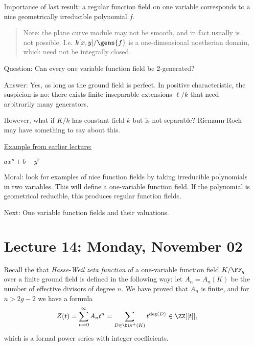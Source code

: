 Importance of last result: a regular function field on one variable
corresponds to a nice geometrically irreducible polynomial \(f\).

\begin{quote}
Note: the plane curve module may not be smooth, and in fact usually is
not possible. I.e. \(k[x ,y]/\gens{f}\) is a one-dimensional noetherian
domain, which need not be integrally closed.
\end{quote}

Question: Can every one variable function field be 2-generated?

Answer: Yes, as long as the ground field is perfect. In positive
characteristic, the suspicion is no: there exists finite inseparable
extensions \(\ell/k\) that need arbitrarily many generators.

However, what if \(K/k\) has constant field \(k\) but is not separable?
Riemann-Roch may have something to say about this.

\begin{example}

\hyperref[technical_example]{Example from earlier lecture:}

\(ax^p + b - y^b\)

\end{example}

Moral: look for examples of nice function fields by taking irreducible
polynomials in two variables. This will define a one-variable function
field. If the polynomial is geometrical reducible, this produces regular
function fields.

Next: One variable function fields and their valuations.

\hypertarget{lecture-14-monday-november-02}{%
\section{Lecture 14: Monday, November
02}\label{lecture-14-monday-november-02}}

Recall the that \emph{Hasse-Weil zeta function} of a one-variable
function field \(K/\FF_q\) over a finite ground field is defined in the
following way: let \(A_n = A_n(K)\) be the number of effective divisors
of degree \(n\). We have proved that \(A_n\) is finite, and for
\(n>2g-2\) we have a formula
\begin{align*}  
Z(t) = \sum_{n=0}^\infty A_n t^n
= \sum_{D\in \Div^+(K)} t^{\deg(D)} \in \ZZ[[t]]
,\end{align*} which is a formal power series with integer coefficients.


